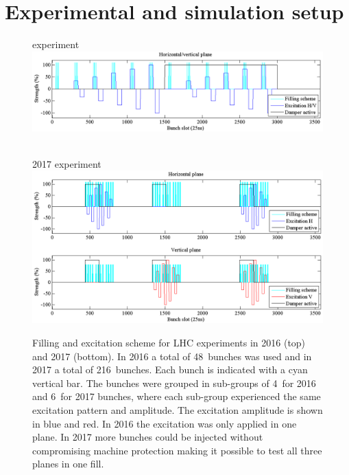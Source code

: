 \documentclass[%
 reprint,
 amsmath,amssymb,
 aps,
prstab,
]{revtex4-1}
\begin{document}
\section{Experimental and simulation setup\label{sec:exp}}
\begin{figure}
	\begin{minipage}[t]{1.0\linewidth}
		 experiment\\
		\includegraphics[width=0.9\linewidth]{bunchfilling_2016.png}	
	\end{minipage}
	\begin{minipage}[t]{1.0\linewidth}
		\centering
		$ $\\
		2017 experiment\\
		\includegraphics[width=0.9\linewidth]{bunchfilling_2017.png}	
	\end{minipage}
	\caption{\label{fig:fill} Filling and excitation scheme for LHC experiments in 2016 (top) and 2017 (bottom). In 2016 a total of 48~bunches was used and in 2017 a total of 216~bunches. Each bunch is indicated with a cyan vertical bar. The bunches were grouped in sub-groups of 4~for 2016 and 6~for 2017 bunches, where each sub-group experienced the same excitation pattern and amplitude. The excitation amplitude is shown in blue and red. In 2016 the excitation was only applied in one plane. In 2017 more bunches could be injected without compromising machine protection making it possible to test all three planes in one fill.}
\end{figure}
\end{document}
